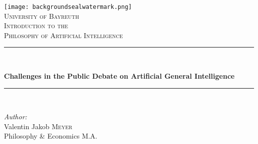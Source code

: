 \documentclass[12pt, a4paper]{article}
\begin{document}
    \begin{titlepage}
    \newcommand{\HRule}{\rule{\linewidth}{0.5mm}} %
    \flushright  \texttt{[image: backgroundsealwatermark.png]}\\[2cm]

    \center %
    \textsc{\LARGE University of Bayreuth}\\[0.75cm] %
    \textsc{\large  Introduction to the \\ Philosophy of Artificial Intelligence}\\[1.5cm]
    \HRule \\[0.4cm]
    { \huge \bfseries  Challenges in the Public Debate on Artificial General Intelligence\par } %
    \vspace{0.8cm}
    \HRule \\[1.5cm]
    \begin{minipage}{0.4\textwidth}
    \begin{flushleft} \large
    \emph{Author:}\\ 
        Valentin Jakob \textsc{Meyer}	\\         %
        Philosophy \& Economics M.A.\\                       %

\end{flushleft}
\end{minipage}
\end{titlepage}
\end{document}
